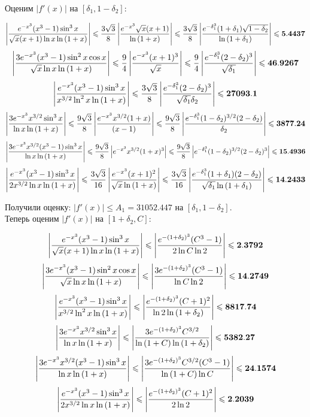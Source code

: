 \documentclass[titlepage]{article}
\def\l{\left}
\def\r{\right}
\def\le{\leqslant}
\begin{document}
Оценим $|f'(x)|$ на $[\delta_1, 1-\delta_2]$:

$$\l| \frac{e^{-x^3}(x^3-1)\sin^3{x}}{\sqrt{x}(x+1)\ln{x}\ln{(1+x)}} \r| \le \frac{3\sqrt{3}}{8}\l| \frac{e^{-x^3}\sqrt{x}(x+1)}{\ln{(1+x)}} \r| \le \frac{3\sqrt{3}}{8}\l| \frac{e^{-\delta_1^3}(1+\delta_1)\sqrt{1-\delta_2}}{\ln{(1+\delta_1)}} \r| \le \bf{5.4437}$$
$$\l| \frac{3e^{-x^3}(x^3-1)\sin^2{x}\cos{x}}{\sqrt{x}\ln{x}\ln{(1+x)}} \r| \le \frac{9}{4}\l| \frac{e^{-x^3}(x+1)^3}{\sqrt{x}} \r| \le \frac{9}{4}\l| \frac{e^{-\delta_1^3}(2-\delta_2)^3}{\sqrt{\delta_1}} \r| \le \bf{46.9267}$$
$$\l| \frac{e^{-x^3}(x^3-1)\sin^3{x}}{x^{3/2}\ln^2{x}\ln{(1+x)}} \r| \le \frac{3\sqrt{3}}{8} \l| \frac{e^{-\delta_1^3}(2-\delta_2)^3}{\sqrt{\delta_1}\delta_2} \r| \le \bf{27093.1}$$
$$\l| \frac{3e^{-x^3}x^{3/2}\sin^3{x}}{\ln{x}\ln{(1+x)}} \r| \le \frac{9\sqrt{3}}{8} \l| \frac{e^{-x^3}x^{3/2}(1+x)}{(x-1)} \r| \le \frac{9\sqrt{3}}{8} \l| \frac{e^{-\delta_1^3}(1-\delta_2)^{3/2}(2-\delta_2)}{\delta_2} \r| \le \bf{3877.24}$$
$$\l| \frac{3e^{-x^3}x^{3/2}(x^3-1)\sin^3{x}}{\ln{x}\ln{(1+x)}} \r| \le \frac{9\sqrt{3}}{8} \l| e^{-x^3}x^{3/2}(1+x)^3 \r| \le \frac{9\sqrt{3}}{8} \l| e^{-\delta_1^3}(1-\delta_2)^{3/2}(2-\delta_2)^3 \r| \le \bf{15.4936}$$
$$\l| \frac{e^{-x^3}(x^3-1)\sin^3{x}}{2x^{3/2}\ln{x}\ln{(1+x)}} \r| \le \frac{3\sqrt{3}}{16} \l| \frac{e^{-x^3}(x+1)^2}{\sqrt{x}\ln{(1+x)}} \r| \le \frac{3\sqrt{3}}{16} \l| \frac{e^{-\delta_1^3}(1+\delta_1)(2-\delta_2)}{\sqrt{\delta_1}\ln{(1+\delta_1)}} \r| \le \bf{14.2433}$$

Получили оценку: $|f'(x)| \le A_1 = 31052.447$ на $[\delta_1, 1-\delta_2]$. \\
Теперь оценим $|f'(x)|$ на $[1+\delta_2, C]$:

$$\l| \frac{e^{-x^3}(x^3-1)\sin^3{x}}{\sqrt{x}(x+1)\ln{x}\ln{(1+x)}} \r| \le \l| \frac{e^{-(1+\delta_2)^3}(C^3-1)}{2\ln{C}\ln{2}} \r| \le \bf{2.3792}$$
$$\l| \frac{3e^{-x^3}(x^3-1)\sin^2{x}\cos{x}}{\sqrt{x}\ln{x}\ln{(1+x)}} \r| \le \l| \frac{3e^{-(1+\delta_2)^3}(C^3-1)}{\ln{C}\ln{2}} \r| \le \bf{14.2749}$$
$$\l| \frac{e^{-x^3}(x^3-1)\sin^3{x}}{x^{3/2}\ln^2{x}\ln{(1+x)}} \r| \le \l| \frac{e^{-(1+\delta_2)^3}(C+1)^2}{\ln{2}\ln{(1+\delta_2)}} \r| \le \bf{8817.74}$$
$$\l| \frac{3e^{-x^3}x^{3/2}\sin^3{x}}{\ln{x}\ln{(1+x)}} \r| \le \l| \frac{3e^{-(1+\delta_2)^3}C^{3/2}}{\ln{(1+C)}\ln{(1+\delta_2)}} \r| \le \bf{5382.27}$$
$$\l| \frac{3e^{-x^3}x^{3/2}(x^3-1)\sin^3{x}}{\ln{x}\ln{(1+x)}} \r| \le \l| \frac{3e^{-(1+\delta_2)^3}C^{3/2}(C^3-1)}{\ln{(1+C)}\ln{C}} \r| \le \bf{24.1574}$$
$$\l| \frac{e^{-x^3}(x^3-1)\sin^3{x}}{2x^{3/2}\ln{x}\ln{(1+x)}} \r| \le \l|\frac{e^{-(1+\delta_2)^3}(C+1)^2}{2\ln{2}} \r| \le \bf{2.2039}$$
\end{document}
